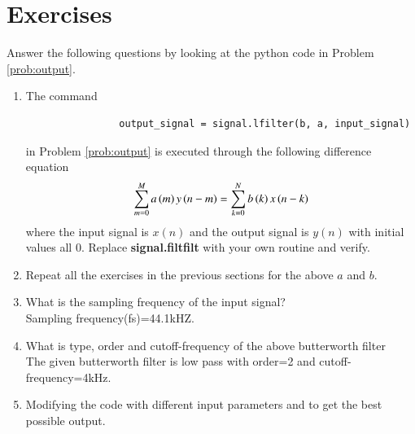 \documentclass[journal,12pt,twocolumn]{IEEEtran}
\renewcommand\thesection{\arabic{section}}
\begin{document}
		\section{Exercises}
		Answer the following questions by looking at the python code in Problem \ref{prob:output}.
		\begin{enumerate}[label=\thesection.\arabic*]
			\item
			The command
			\begin{lstlisting}
				output_signal = signal.lfilter(b, a, input_signal)
			\end{lstlisting}
			in Problem \ref{prob:output} is executed through the following difference equation
			\begin{equation}
				\label{eq:iir_filter_gen}
				\sum _{m=0}^{M}a\left(m\right)y\left(n-m\right)=\sum _{k=0}^{N}b\left(k\right)x\left(n-k\right)
			\end{equation}
			where the input signal is $x(n)$ and the output signal is $y(n)$ with initial values all 0. Replace
			\textbf{signal.filtfilt} with your own routine and verify.
			\item Repeat all the exercises in the previous sections for the above $a$ and $b$.
			\item What is the sampling frequency of the input signal?
			\\
			\solution
			Sampling frequency(fs)=44.1kHZ.
			\item
			What is type, order and  cutoff-frequency of the above butterworth filter
			\\
			\solution
			The given butterworth filter is low pass with order=2 and cutoff-frequency=4kHz.
			\item
			Modifying the code with different input parameters and to get the best possible output.
		\end{enumerate}
	
\end{document}
